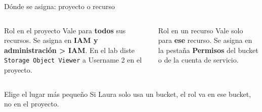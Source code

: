 \documentclass[aspectratio=169,10pt,c]{beamer}
\begin{document}
\begin{frame}{Dónde se asigna: proyecto o recurso}
\begin{center}
\end{center}
\begin{columns}[T,onlytextwidth]
\begin{block}{Rol en el proyecto}
\small Vale para \textbf{todos} sus recursos. Se asigna en \textbf{IAM y administración > IAM}. En el lab diste \texttt{Storage Object Viewer} a Username 2 en el proyecto.
\end{block}
\begin{block}{Rol en un recurso}
\small Vale solo para \textbf{ese} recurso. Se asigna en la pestaña \textbf{Permisos} del bucket o de la cuenta de servicio.
\end{block}
\end{columns}
\par\vspace{2mm}
\begin{alertblock}{Elige el lugar más pequeño}
\small Si Laura solo usa un bucket, el rol va en ese bucket, no en el proyecto.
\end{alertblock}
\end{frame}
\end{document}
